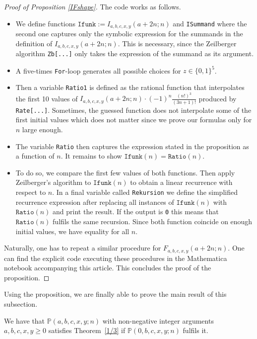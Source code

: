 \documentclass{amsart}
\numberwithin{equation}{section}
\begin{document}
\begin{proof}[Proof of Proposition \ref{IFshape}]
    The code works as follows.
    \begin{itemize}
        \item[(1)] We define functions $\texttt{Ifunk}:=I_{a,b,c,x,y}(a+2n;n)$ and \texttt{ISummand} where the second one captures only the symbolic expression for the summands in the definition of $I_{a,b,c,x,y}(a+2n;n)$. This is necessary, since the Zeilberger algorithm \texttt{Zb[...]} only takes the expression of the summand as its argument.
        \item[(2)] A five-times \texttt{For}-loop generates all possible choices for $z\in\{0,1\}^5$.
        \item[(3)] Then a variable \texttt{Ratio1} is defined as the rational function that interpolates the first 10 values of $I_{a,b,c,x,y}(a+2n;n)\cdot (-1)^n\frac{(n!)^3}{(3n+1)!}$ produced by \texttt{Rate[...]}. Sometimes, the guessed function does not interpolate some of the first initial values which does not matter since we prove our formulas only for $n$ large enough.
        \item[(4)] The variable \texttt{Ratio} then captures the expression stated in the proposition as a function of $n$. It remains to show $\texttt{Ifunk}(n)=\texttt{Ratio}(n)$.
        \item[(5)] To do so, we compare the first few values of both functions. Then apply Zeilberger's algorithm to $\texttt{Ifunk}(n)$ to obtain a linear recurrence with respect to $n$. In a final variable called \texttt{Rekursion} we define the simplified recurrence expression after replacing all instances of $\texttt{Ifunk}(n)$ with $\texttt{Ratio}(n)$ and print the result. If the output is \texttt{0} this means that $\texttt{Ratio}(n)$ fulfils the same recursion. Since both function coincide on enough initial values, we have equality for all $n$.
    \end{itemize}

Naturally, one has to repeat a similar procedure for $F_{a,b,c,x,y}(a+2n;n)$. One can find the explicit code executing these procedures in the Mathematica notebook accompanying this article.
This concludes the proof of the proposition. 
\end{proof}

Using the proposition, we are finally able to prove the main result of this subsection.
\begin{thm}\label{pararedA}
    We have that $\mathbb{P}(a,b,c,x,y;n)$ with non-negative integer arguments $a,b,c,x,y\geq 0$ satisfies Theorem~\ref{1/3} if $\mathbb{P}(0,b,c,x,y;n)$ fulfils it. 
\end{thm}
\end{document}
